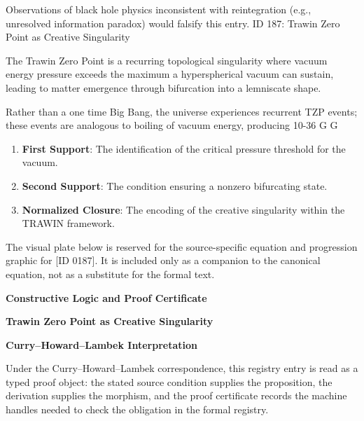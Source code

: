Observations of black hole physics inconsistent with reintegration (e.g., unresolved information paradox) would falsify this entry. ID 187: Trawin Zero Point as Creative Singularity

The Trawin Zero Point is a recurring topological singularity where vacuum energy pressure exceeds the maximum a hyperspherical vacuum can sustain, leading to matter emergence through bifurcation into a lemniscate shape.  

Rather than a one time Big Bang, the universe experiences recurrent TZP events; these events are analogous to boiling of vacuum energy, producing  10-36 G G
\endgroup

\begin{enumerate}[leftmargin=1.6em,itemsep=6pt,topsep=4pt]
\item \textbf{First Support}: The identification of the critical pressure threshold for the vacuum.
\item \textbf{Second Support}: The condition ensuring a nonzero bifurcating state.
\item \textbf{Normalized Closure}: The encoding of the creative singularity within the TRAWIN framework.
\end{enumerate}

\begingroup\footnotesize\sloppy
The visual plate below is reserved for the source-specific equation and progression graphic for [ID 0187]. It is included only as a companion to the canonical equation, not as a substitute for the formal text.
\par\endgroup
\ifTZPDarkEdition
{}
\fi

\clearpage
\begingroup\tzpsupportsetup
\noindent\textbf{\fontsize{10.8pt}{12.8pt}\selectfont [ID 0187] Constructive Logic and Proof Certificate}\par
\noindent\textbf{\fontsize{10pt}{12pt}\selectfont Trawin Zero Point as Creative Singularity}\par
\vspace{0.45em}
\begingroup
\footnotesize
\setlength{\parskip}{0.22em}
\setlength{\parindent}{0pt}
\noindent\textbf{Curry--Howard--Lambek Interpretation}\par
Under the Curry--Howard--Lambek correspondence, this registry entry is read as a typed proof
object: the stated source condition supplies the proposition, the derivation supplies the
morphism, and the proof certificate records the machine handles needed to check the obligation
in the formal registry.

